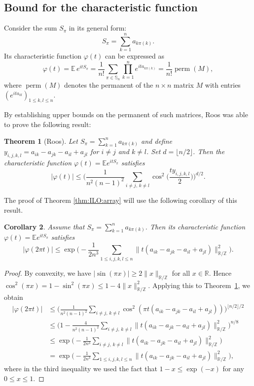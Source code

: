 \documentclass[reqno]{amsart}
\newcommand\R{{\mathbb{R}}}
\newcommand\Z{{\mathbb{Z}}}
\newcommand\E{{\mathbb{E}}}
\def\perm{\operatorname{perm}}
\theoremstyle{plain}
\newtheorem{theorem}{Theorem}[section]
\newtheorem{corollary}[theorem]{Corollary}
\theoremstyle{definition}
\begin{document}
\subsection{Bound for the characteristic function}

Consider the sum $S_{\pi}$ in its general form:
\[ 
S_{\pi} = \sum_{k=1}^{n} a_{k \pi(k)}.\]
Its characteristic function $\varphi(t)$ can be expressed as
\[
\varphi(t) = \mathbb{E} \, e^{it S_{\pi}} = \frac{1}{n!}\sum_{\pi \in \mathbb{S}_n} \prod_{k=1}^{n} e^{it a_{k\pi(k)}}= \frac{1}{n!} \perm(M),
\]
where $\perm(M)$ denotes the permanent of the $n \times n$ matrix $M$ with entries $(e^{it a_{kl}})_{1 \le k,l \le n}$.

By establishing upper bounds on the permanent of such matrices, Roos \cite[Theorem 1.4]{Roo} was able to prove the following result:

\begin{theorem}[Roos]\label{thm:Roo}
Let $S_{\pi}=\sum_{k=1}^{n} a_{k\pi(k)}$ and define 
$y_{i,j,k,l}=a_{ik}-a_{jk}-a_{il}+a_{jl}$ for $i\ne j$ and $k\ne l$.
Set $d=\lfloor n/2\rfloor$. Then the characteristic function 
$\varphi(t)=\mathbb{E}e^{itS_{\pi}}$ satisfies
\[
|\varphi(t)|\le \Big(\frac{1}{n^2(n-1)^2}
\sum_{i\ne j,\,k\ne l}
\cos^2\Big(\frac{t y_{i,j,k,l}}{2}\Big)\Big)^{d/2}.
\]
\end{theorem}

The proof of Theorem \ref{thm:ILO:array} will use the following corollary of this result.

\begin{corollary}\label{cor:Roos}
Assume that $S_{\pi} = \sum_{k=1}^{n} a_{k \pi(k)}$.
Then its characteristic function $\varphi(t) = \E e^{it S_{\pi}}$ satisfies
\[
|\varphi(2\pi t)| \le \exp\Big(-\frac{1}{2n^{3}} \sum_{1\le i,j,k,l\le n} \|t (a_{ik} - a_{jk} -a_{il} + a_{jl})\|^2_{\R/\Z}\Big).
\] 
\end{corollary}
\begin{proof}
By convexity, we have $|\sin(\pi x)|\ge 2 \|x\|_{\R/\Z}$ for all $x\in \R$. Hence
$\cos^2 (\pi x)=1-\sin^2 (\pi x) \le 1-4\|x\|^2_{\R/\Z}$. Applying this to Theorem~\ref{thm:Roo}, we obtain
\begin{align*}
|\varphi(2\pi t)| &\le \Big(  \frac{1}{n^{2}(n-1)^{2}} \sum_{i\ne j, \, k\ne l} \cos^{2} (\pi t (a_{ik} - a_{jk} -a_{il} + a_{jl}))\Big)^{ \lfloor n/2 \rfloor/2}\\
&\le \Big( 1- \frac{4}{n^{2}(n-1)^{2}} \sum_{i\ne j, \, k\ne l} \|t (a_{ik} - a_{jk} -a_{il} + a_{jl})\|^2_{\R/\Z}\Big)^{n/8}\\
&\le \exp\Big(-\frac{1}{2n^{3}} \sum_{i\ne j, \, k\ne l} \|t (a_{ik} - a_{jk} -a_{il} + a_{jl})\|^2_{\R/\Z}\Big)\\
&=\exp\Big(-\frac{1}{2n^{3}} \sum_{1\le i,j,k,l\le n} \|t (a_{ik} - a_{jk} -a_{il} + a_{jl})\|^2_{\R/\Z}\Big),
\end{align*}
where in the third inequality we used the fact that $1-x\le \exp(-x)$ for any $0\le x\le 1$.
\end{proof}
\end{document}
